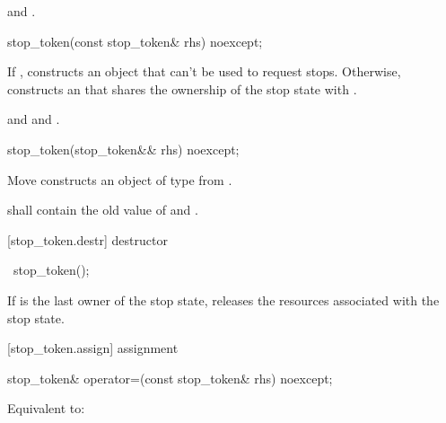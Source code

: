 {\begin{itemdescr}
  \pnum\postconditions {} and 
                       .
\end{itemdescr}


%
\begin{itemdecl}
stop_token(const stop_token& rhs) noexcept;
\end{itemdecl}
\begin{itemdescr}
  \pnum\effects If , constructs an  object
                that can't be used to request stops.
                Otherwise, constructs an 
                that shares the ownership of the stop state with .

  \pnum\postconditions {}
                and 
                and .
\end{itemdescr}

%
\begin{itemdecl}
stop_token(stop_token&& rhs) noexcept;
\end{itemdecl}
\begin{itemdescr}
  \pnum\effects Move constructs an object of type  from .

  \pnum\postconditions {} shall contain the old value of  and
                        .
\end{itemdescr}

[stop_token.destr]{ destructor}

%
\begin{itemdecl}
~stop_token();
\end{itemdecl}

\begin{itemdescr}
 \pnum\effects If  is the last owner of the stop state,
                releases the resources associated with the stop state.
\end{itemdescr}

[stop_token.assign]{ assignment}

%
\begin{itemdecl}
stop_token& operator=(const stop_token& rhs) noexcept;
\end{itemdecl}
\begin{itemdescr}
  \pnum\effects Equivalent to: 


\end{itemdescr}}
